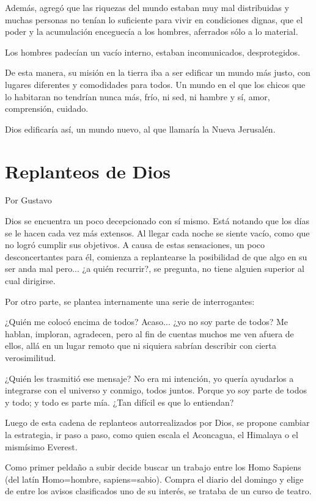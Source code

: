 \documentclass[11pt,twoside,openright,a5paper]{book}
\begin{document}
Además, agregó que las riquezas del mundo estaban muy mal distribuidas y muchas personas no tenían lo suficiente para vivir en condiciones dignas, que el poder y la acumulación enceguecía a los hombres, aferrados sólo a lo material.

Los hombres padecían un vacío interno, estaban incomunicados, desprotegidos.

De esta manera, su misión en la tierra iba a ser  edificar un mundo más justo, con lugares diferentes y comodidades para todos. Un mundo en el que los chicos que lo habitaran no tendrían  nunca más, frío, ni sed, ni hambre y sí, amor, comprensión, cuidado.

Dios edificaría así, un mundo nuevo, al que llamaría la Nueva Jerusalén.
  
\section*{Replanteos de Dios}

\begin{flushright}Por Gustavo\end{flushright}

Dios se encuentra un poco decepcionado con sí mismo. Está notando que los días se le hacen cada vez más extensos. Al llegar cada noche se siente vacío, como que no logró cumplir sus objetivos. A causa de estas sensaciones, un poco desconcertantes para él, comienza a replantearse la posibilidad de que algo en su ser anda mal pero... ¿a quién recurrir?, se pregunta, no tiene alguien superior al cual dirigirse.

Por otro parte, se plantea internamente una serie de interrogantes:

¿Quién me colocó encima de todos? Acaso... ¿yo no soy parte de todos? Me hablan, imploran, agradecen, pero al fin de cuentas muchos me ven afuera de ellos, allá en un lugar remoto que ni siquiera sabrían describir con cierta verosimilitud. 

¿Quién les trasmitió ese mensaje? No era mi intención, yo quería ayudarlos a integrarse con el universo y conmigo, todos juntos. Porque yo soy parte de todos y todo; y todo es parte mía. ¿Tan difícil es que lo entiendan?

Luego de esta cadena de replanteos autorrealizados por Dios, se propone cambiar la estrategia, ir paso a paso, como quien escala el Aconcagua, el Himalaya o el mismísimo Everest. 

Como primer peldaño a subir decide buscar un trabajo entre los Homo Sapiens (del latín Homo=hombre, sapiens=sabio). Compra el diario del domingo y elige de entre los avisos clasificados uno de su interés, se trataba de un curso de teatro.
\end{document}
